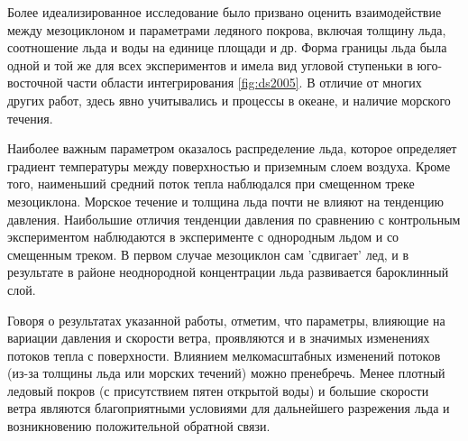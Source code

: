 Более идеализированное исследование \citep{DiererSchluenzen2005} было призвано оценить взаимодействие между мезоциклоном и  параметрами ледяного покрова, включая толщину льда, соотношение льда и воды на единице площади и др. Форма границы льда была одной и той же для всех экспериментов и имела вид угловой ступеньки в юго-восточной части области интегрирования \ref{fig:ds2005}. В отличие от многих других работ, здесь явно учитывались и процессы в океане, и наличие морского течения.
 
Наиболее важным параметром оказалось распределение льда, которое определяет градиент температуры между поверхностью и приземным слоем воздуха. Кроме того, наименьший средний поток тепла наблюдался при смещенном треке мезоциклона. Морское течение и толщина льда почти не влияют на тенденцию давления. Наибольшие отличия тенденции давления по сравнению с контрольным экспериментом наблюдаются в эксперименте с однородным льдом и со смещенным треком. В первом случае мезоциклон сам 'сдвигает' лед, и в результате в районе неоднородной концентрации льда развивается бароклинный слой.

Говоря о результатах указанной работы, отметим, что параметры, влияющие на вариации давления и скорости ветра, проявляются и в значимых изменениях потоков тепла с поверхности. Влиянием мелкомасштабных изменений потоков (из-за толщины льда или морских течений) можно пренебречь. Менее плотный ледовый покров (с присутствием пятен открытой воды) и большие скорости ветра являются благоприятными условиями для дальнейшего разрежения льда и возникновению положительной обратной связи.

%
%
%